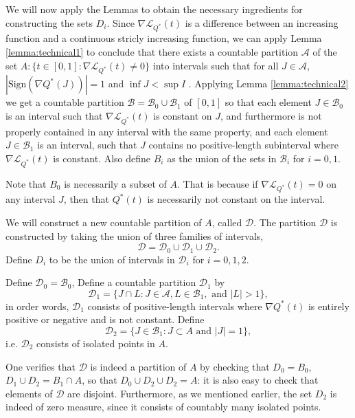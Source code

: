 \documentclass[12pt]{article}
\begin{document}
We will now apply the Lemmas to obtain the necessary ingredients for
constructing the sets $D_i$.  Since $\nabla \mathcal{L}_{Q^*}(t)$ is a difference
between an increasing function and a continuous stricly increasing
function, we can apply Lemma \ref{lemma:technical1} to conclude that
there exists a countable partition $\mathcal{A}$ of the set
$A: \{t \in [0,1]: \nabla \mathcal{L}_{Q^*}(t) \neq 0\}$ into intervals such that
for all $J \in \mathcal{A}$, $|\text{Sign}(\nabla Q^*(J))| = 1$ and
$\inf J < \sup I$ .  Applying Lemma \ref{lemma:technical2} we get a
countable partition $\mathcal{B} = \mathcal{B}_0 \cup \mathcal{B}_1$
of $[0,1]$ so that each element $J \in \mathcal{B}_0$ is an interval
such that $\nabla \mathcal{L}_{Q^*}(t)$ is constant on $J$, and furthermore is not
properly contained in any interval with the same property, and each
element $J \in \mathcal{B}_1$ is an interval, such that $J$ contains
no positive-length subinterval where $\nabla \mathcal{L}_{Q^*}(t)$ is constant.
Also define $B_i$ as the union of the sets in $\mathcal{B}_i$ for $i =
0,1$.

Note that $B_0$ is necessarily a subset of $A$.  That is because if
$\nabla \mathcal{L}_{Q^*}(t) = 0$ on any interval $J$, then that $Q^*(t)$ is
necessarily not constant on the interval.  

We will construct a new countable partition of $A$, called $\mathcal{D}$.
The partition $\mathcal{D}$ is constructed by taking the union of three families of intervals,
\[
\mathcal{D} = \mathcal{D}_0 \cup \mathcal{D}_1 \cup \mathcal{D}_2.
\]
Define $D_i$ to be the union of intervals in $\mathcal{D}_i$ for $i = 0,1,2$.

Define $\mathcal{D}_0 = \mathcal{B}_0$,
Define a countable partition $\mathcal{D}_1$ by
\[
\mathcal{D}_1 = \{J \cap L: J \in \mathcal{A}, L \in \mathcal{B}_1, \text{ and } |L| > 1\},
\]
in order words, $\mathcal{D}_1$ consists of positive-length intervals where $\nabla
Q^*(t)$ is entirely positive or negative and is not constant.
Define
\[
\mathcal{D}_2 = \{J \in \mathcal{B}_1: J \subset A \text{ and } |J| = 1 \},
\]
i.e. $\mathcal{D}_2$ consists of isolated points in $A$.

One verifies that $\mathcal{D}$ is indeed a partition of $A$ by
checking that $D_0 = B_0$, $D_1 \cup D_2 = B_1 \cap A$, so that
$D_0 \cup D_2 \cup D_2 = A$: it is also easy to check that elements of
$\mathcal{D}$ are disjoint.  Furthermore, as we mentioned earlier, the
set $D_2$ is indeed of zero measure, since it consists of countably
many isolated points.
\end{document}
